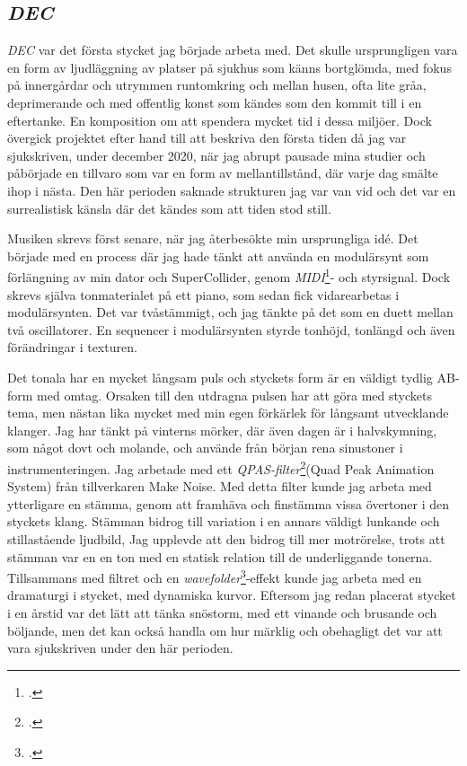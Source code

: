 \documentclass{article}
\begin{document}
\subsection{\emph{DEC}}\nocite{DEC}
\emph{DEC} var det första stycket jag började arbeta med. Det skulle ursprungligen vara en form av ljudläggning
av platser på sjukhus som känns bortglömda, med fokus på innergårdar och utrymmen runtomkring och mellan
husen, ofta lite gråa, deprimerande och med offentlig konst som kändes som den kommit till i en eftertanke. En
komposition om att spendera mycket tid i dessa miljöer. Dock övergick projektet efter hand till att beskriva
den första tiden då jag var sjukskriven, under december 2020, när jag abrupt pausade mina studier
och påbörjade en tillvaro som var en form av mellantillstånd, där varje dag smälte ihop i nästa. Den här
perioden saknade strukturen jag var van vid och det var en surrealistisk känsla där det kändes som att tiden
stod still.

Musiken skrevs först senare, när jag återbesökte min ursprungliga idé. Det började med en process där jag hade
tänkt att använda en modulärsynt som förlängning av min dator och SuperCollider, genom
\emph{MIDI}\footcite{midi}- och styrsignal. 
Dock skrevs själva tonmaterialet på ett piano, som sedan fick vidarearbetas i modulärsynten. Det var
tvåstämmigt, och jag tänkte på det som en duett mellan två oscillatorer. En sequencer i modulärsynten styrde 
tonhöjd, tonlängd och även förändringar i texturen. 

Det tonala har en mycket långsam puls och styckets form är en väldigt tydlig AB-form med omtag. Orsaken till
den utdragna pulsen har att göra med styckets tema, men nästan lika mycket med min egen förkärlek för långsamt
utvecklande klanger. Jag har tänkt på vinterns mörker, där även dagen är i halvskymning, som något dovt och
molande, och använde från början rena sinustoner i instrumenteringen. Jag arbetade med ett
\emph{QPAS-filter}\footcite{qpas}(Quad Peak Animation System) från
tillverkaren Make Noise. Med detta filter kunde jag arbeta med ytterligare en stämma, genom att framhäva och
finstämma vissa övertoner i den styckets klang. Stämman bidrog till variation i en annars väldigt lunkande och
stillastående ljudbild, Jag upplevde att den bidrog till mer motrörelse, trots att stämman var en en ton med
en statisk relation till de underliggande tonerna. Tillsammans med filtret och en
\emph{wavefolder}\footcite{wavefolder}-effekt kunde jag arbeta med en dramaturgi i
stycket, med dynamiska kurvor. Eftersom jag redan placerat stycket i en årstid var det lätt att tänka
snöstorm, med ett vinande och brusande och böljande, men det kan också handla om hur märklig och obehagligt
det var att vara sjukskriven under den här perioden.
\end{document}
